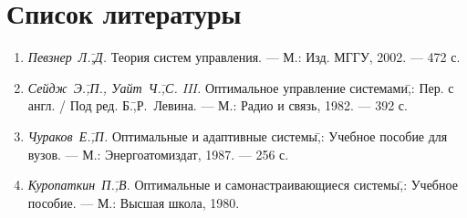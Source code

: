 \documentclass[preprint,russian,a5paper,10pt,twoside,mediummath]{ncc}
\newcommand*{\mysum}[3][]{
	\node[circle,thick,inner sep=0pt,minimum size=2ex] (#3) [#2] {};
	\foreach \i in {#1} {
		\fill[black!50] let \p1 = ($ (#3.east) - (#3.center) $), \n1 = {veclen(\x1,\y1)}, \n2 = { -135 + 90*\i ) } in
			(#3.center) -- ++(\n2:\n1) arc (\n2:{ \n2 + 90 }:\n1) -- cycle;
	}
	\draw[semithick] (#3.north west) -- (#3.south east)
					  (#3.south west) -- (#3.north east);
	\draw[thick] let \p1 = ($ (#3.east) - (#3.center) $), \n1 = {veclen(\x1,\y1)} in (#3.center) circle (\n1);
}
\begin{document}
%
%
%	
%
%		
%	
%	
%
%
%	
%	
%	
%
%	
%	
%	
%
%	
%	
%		


\clearpage

\setcounter{secnumdepth}{-1}
\section{Список литературы\label{references}}
\setcounter{secnumdepth}{2}
\begin{enumerate}
\item \textit{Певзнер~Л.\=,Д.} Теория систем управления. --- М.: Изд. МГГУ, 2002. --- 472 с.
\item \textit{Сейдж~Э.\=,П., Уайт~Ч.\=,С. III.} Оптимальное управление системами\=,: Пер. с англ. / Под ред. Б.\=,Р.~Левина. --- М.: Радио и связь, 1982. --- 392 с.
\item \textit{Чураков~Е.\=,П.} Оптимальные и адаптивные системы\=,: Учебное пособие для вузов. --- М.: Энергоатомиздат, 1987. --- 256 с.
\item \textit{Куропаткин~П.\=,В.} Оптимальные и самонастраивающиеся системы\=,: Учебное пособие. --- М.: Высшая школа, 1980.
\end{enumerate}
\end{document}
